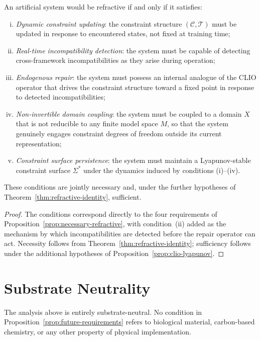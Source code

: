 \documentclass[11pt,openany]{book}
\begin{document}
\begin{proposition}
\label{prop:future-requirements}
An artificial system would be refractive if and only if it
satisfies:
\begin{enumerate}[(i)]
  \item \emph{Dynamic constraint updating}: the constraint
    structure $(\mathcal{C}, \mathcal{T})$ must be updated
    in response to encountered states, not fixed at
    training time;
  \item \emph{Real-time incompatibility detection}: the
    system must be capable of detecting cross-framework
    incompatibilities as they arise during operation;
  \item \emph{Endogenous repair}: the system must possess
    an internal analogue of the CLIO operator that
    drives the constraint structure toward a fixed point
    in response to detected incompatibilities;
  \item \emph{Non-invertible domain coupling}: the system
    must be coupled to a domain $X$ that is not reducible
    to any finite model space $M$, so that the system
    genuinely engages constraint degrees of freedom
    outside its current representation;
  \item \emph{Constraint surface persistence}: the system
    must maintain a Lyapunov-stable constraint surface
    $\Sigma^*$ under the dynamics induced by conditions
    (i)--(iv).
\end{enumerate}
These conditions are jointly necessary and, under the
further hypotheses of Theorem~\ref{thm:refractive-identity},
sufficient.
\end{proposition}

\begin{proof}
The conditions correspond directly to the four requirements
of Proposition~\ref{prop:necessary-refractive}, with
condition~(ii) added as the mechanism by which
incompatibilities are detected before the repair operator
can act.  Necessity follows from
Theorem~\ref{thm:refractive-identity}; sufficiency follows
under the additional hypotheses of
Proposition~\ref{prop:clio-lyapunov}.
\end{proof}

\section{Substrate Neutrality}
\label{sec:substrate}

The analysis above is entirely substrate-neutral.  No
condition in Proposition~\ref{prop:future-requirements}
refers to biological material, carbon-based chemistry, or
any other property of physical implementation.
\end{document}
